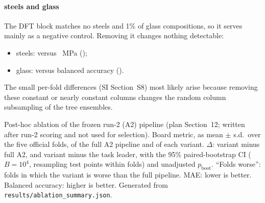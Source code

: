 \paragraph{steels and glass}
The DFT block matches no steels and 1\% of glass compositions, so it serves mainly as a negative control. Removing it changes nothing detectable:
\begin{itemize}
\item steels: \AblNoDftSteels{} versus \AtwoFinalSteels~MPa (\AblNoDftSteelsPExpr);
\item glass: \AblNoDftGlass{} versus \AtwoFinalGlass{} balanced accuracy (\AblNoDftGlassPExpr).
\end{itemize}
The small per-fold differences (SI Section~S8) most likely arise because removing these constant or nearly constant columns changes the random column subsampling of the tree ensembles.

\begin{table}[t]
\centering
\caption{Post-hoc ablation of the frozen run-2 (A2) pipeline (plan Section~12; written after run-2 scoring and not used for selection). Board metric, as mean $\pm$ s.d.\ over the five official folds, of the full A2 pipeline and of each variant. $\Delta$: variant minus full A2, and variant minus the task leader, with the 95\% paired-bootstrap CI ($B=10^4$, resampling test points within folds) and unadjusted $p_\mathrm{boot}$. ``Folds worse'': folds in which the variant is worse than the full pipeline. MAE: lower is better. Balanced accuracy: higher is better. Generated from \texttt{results/ablation\_summary.json}.}
\label{tab:ablation}
\footnotesize
\setlength{\tabcolsep}{3pt}
\begin{adjustbox}{max width=\textwidth}

\end{adjustbox}
\end{table}

